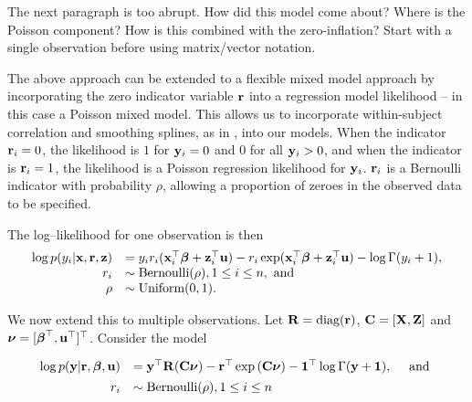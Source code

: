 \documentclass{amsart}[12pt]
\newcommand{\joc}[1]{{\color{red}#1}}
\begin{document}
\joc{The next paragraph is too abrupt. How did this model come about? Where is the Poisson component? How is this combined with the zero-inflation?
Start with a single observation before using matrix/vector notation.}

The above approach can be extended to a flexible mixed model approach by incorporating the zero indicator
variable ${\bf r}$ into a regression model likelihood -- in this case a Poisson mixed model. This allows us to
incorporate within-subject correlation and smoothing splines, as in \citep{Wand2008}, into our models. When
the indicator ${\bf r}_i = 0$, the likelihood is $1$ for ${\bf y}_i = 0$ and $0$ for all ${\bf y}_i > 0$, and when the
indicator is ${\bf r}_i = 1$, the likelihood is a Poisson regression likelihood for ${\bf y}_i$. ${\bf r}_i$ is a
Bernoulli indicator with probability $\rho$, allowing a proportion of zeroes in the observed data to be
specified.

The log--likelihood for one observation is then
\begin{equation*}
	\begin{array}{rl}
		\log p(y_i | {\bf x}, {\bf r}, {\bf z}) & = y_i r_i ({\bf x}_i^\top {\boldsymbol\beta} + {\bf z}_i^\top {\bf u}) - r_i \exp ({\bf x}_i^\top {\boldsymbol\beta} + {\bf z}_i^\top {\bf u}) - \log \Gamma (y_i + 1), \\
		r_i                         & \sim \text{Bernoulli}(\rho), 1 \leq i \leq n, \text{ and }                                                              \\
		\rho                        & \sim \mbox{Uniform}(0, 1).                                                                                              \\
	\end{array}
\end{equation*}

\noindent We now extend this to multiple observations. Let ${\bf R} = \text{diag}{({\bf r})}$, ${\bf C} = [{\bf X}, {\bf Z}]$ and ${\boldsymbol \nu} = [{\boldsymbol \beta}^\top, {\bf u}^\top]^\top$. Consider the model

\begin{equation}\label{eq:main}
	\begin{array}{rl}
		\log{p({\bf y}|{\bf r}, {\boldsymbol\beta}, {\bf u})} & = {\bf y}^\top {\bf R} ({\bf C}{\boldsymbol \nu}) - {\bf r}^\top \exp{({\bf C}{\boldsymbol\nu})} - {\bf 1}^\top \log{\Gamma{({\bf y}+ {\bf1})}}, \quad \mbox{ and } \\ [1ex]
		r_i                           & \sim \text{Bernoulli}(\rho), 1 \leq i \leq n                                                                     \\
	\end{array}
\end{equation}
\end{document}
